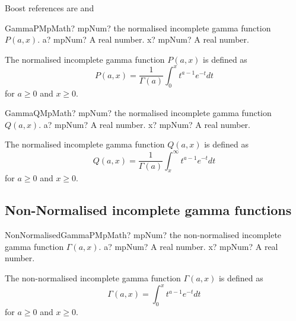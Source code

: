 \label{IncompleteGammaFunctionMpMath}

Boost references are \cite{Temme_1979} and \cite{Temme_1994}



\begin{mpFunctionsExtract}
	\mpFunctionTwoNotImplemented
	{GammaPMpMath? mpNum? the normalised incomplete gamma function $P(a,x)$.}
	{a? mpNum? A real number.}
	{x? mpNum? A real number.}
\end{mpFunctionsExtract}

\vspace{0.3cm}
The normalised incomplete gamma function $P(a,x)$ is defined as
\begin{equation}
P(a,x)=\frac{1}{\Gamma(a)} \int_0^x t^{a-1} e^{-t}dt
\end{equation}
for $a \geq 0$ and $x \geq 0$.

\vspace{0.6cm}
\begin{mpFunctionsExtract}
	\mpFunctionTwoNotImplemented
	{GammaQMpMath? mpNum? the normalised incomplete gamma function $Q(a,x)$.}
	{a? mpNum? A real number.}
	{x? mpNum? A real number.}
\end{mpFunctionsExtract}


\vspace{0.3cm}
The normalised incomplete gamma function $Q(a,x)$ is defined as
\begin{equation}
Q(a,x)=\frac{1}{\Gamma(a)} \int_x^{\infty} t^{a-1} e^{-t}dt
\end{equation}
for $a \geq 0$ and $x \geq 0$.



\subsection{Non-Normalised incomplete gamma functions}

\begin{mpFunctionsExtract}
	\mpFunctionTwoNotImplemented
	{NonNormalisedGammaPMpMath? mpNum? the non-normalised incomplete gamma function $\Gamma(a,x)$.}
	{a? mpNum? A real number.}
	{x? mpNum? A real number.}
\end{mpFunctionsExtract}

\vspace{0.3cm}
The non-normalised incomplete gamma function $\Gamma(a,x)$ is defined as
\begin{equation}
\Gamma(a,x)= \int_0^x t^{a-1} e^{-t}dt
\end{equation}
for $a \geq 0$ and $x \geq 0$.

